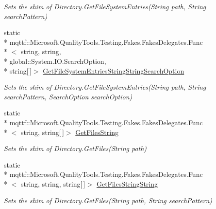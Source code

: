 \begin{DoxyCompactItemize}
\begin{DoxyCompactList}\small\item\em Sets the shim of Directory.\-Get\-File\-System\-Entries(\-String path, String search\-Pattern)\end{DoxyCompactList}\item 
static \\*
mqttf\-::\-Microsoft.\-Quality\-Tools.\-Testing.\-Fakes.\-Fakes\-Delegates.\-Func\\*
$<$ string, string, \\*
global\-::\-System.\-I\-O.\-Search\-Option, \\*
string\mbox{[}$\,$\mbox{]}$>$ \hyperlink{class_system_1_1_i_o_1_1_fakes_1_1_shim_directory_a9b63eff11744a7bf62bd4d3fb956b54e}{Get\-File\-System\-Entries\-String\-String\-Search\-Option}
\begin{DoxyCompactList}\small\item\em Sets the shim of Directory.\-Get\-File\-System\-Entries(\-String path, String search\-Pattern, Search\-Option search\-Option)\end{DoxyCompactList}\item 
static \\*
mqttf\-::\-Microsoft.\-Quality\-Tools.\-Testing.\-Fakes.\-Fakes\-Delegates.\-Func\\*
$<$ string, string\mbox{[}$\,$\mbox{]}$>$ \hyperlink{class_system_1_1_i_o_1_1_fakes_1_1_shim_directory_a5cc06d6ba37c30a55e6cc99635cfabeb}{Get\-Files\-String}
\begin{DoxyCompactList}\small\item\em Sets the shim of Directory.\-Get\-Files(\-String path)\end{DoxyCompactList}\item 
static \\*
mqttf\-::\-Microsoft.\-Quality\-Tools.\-Testing.\-Fakes.\-Fakes\-Delegates.\-Func\\*
$<$ string, string, string\mbox{[}$\,$\mbox{]}$>$ \hyperlink{class_system_1_1_i_o_1_1_fakes_1_1_shim_directory_aa9ee82a1ddf6f377532922b97fe5f256}{Get\-Files\-String\-String}
\begin{DoxyCompactList}\small\item\em Sets the shim of Directory.\-Get\-Files(\-String path, String search\-Pattern)\end{DoxyCompactList}\item 

\end{DoxyCompactItemize}
